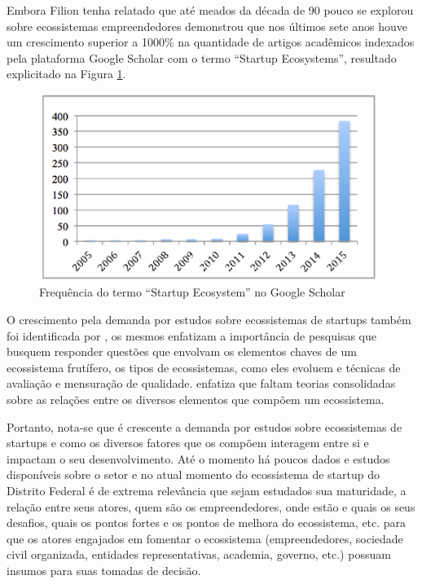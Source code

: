 Embora Filion tenha relatado que até meados da década de 90 pouco se explorou sobre ecossistemas empreendedores   demonstrou que nos últimos sete anos houve um crescimento superior a 1000\% na quantidade de artigos acadêmicos indexados pela plataforma Google Scholar com o termo ``Startup Ecosystems'', resultado explicitado na Figura \ref{figure:papers_about_startup_ecosystems}.

\begin{figure}[!htb]
	\centering
	\includegraphics[width=11cm,angle=0]{figuras/papers_about_startup_ecosystems}
	\caption{Frequência do termo ``Startup Ecosystem'' no Google Scholar}
	\label{figure:papers_about_startup_ecosystems}
\end{figure}

O crescimento pela demanda por estudos sobre ecossistemas de startups também foi identificada por , os mesmos enfatizam a importância de pesquisas que busquem responder questões que envolvam os elementos chaves de um ecossistema frutífero, os tipos de ecossistemas, como eles evoluem e técnicas de avaliação e mensuração de qualidade.  enfatiza que faltam teorias consolidadas sobre as relações entre os diversos elementos que compõem um ecossistema.

Portanto, nota-se que é crescente a demanda por estudos sobre ecossistemas de startups e como os diversos fatores que os compõem interagem entre si e impactam o seu desenvolvimento. Até o momento há poucos dados e estudos disponíveis sobre o setor e no atual momento do ecossistema de startup do Distrito Federal é de extrema relevância que sejam estudados sua maturidade, a relação entre seus atores, quem são os empreendedores, onde estão e quais os seus desafios, quais os pontos fortes e os pontos de melhora do ecossistema, etc. para que os atores engajados em fomentar o ecossistema (empreendedores, sociedade civil organizada, entidades representativas, academia, governo, etc.) possuam insumos para suas tomadas de decisão. 

